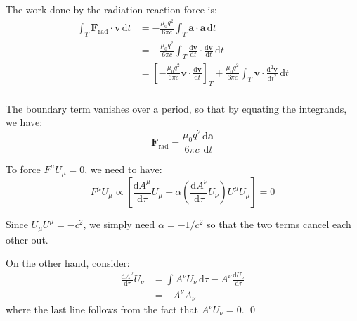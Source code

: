 \documentclass[12pt]{article}
\begin{document}

The work done by the radiation reaction force is:
\begin{equation}
    \begin{split}
        \int_{T} \mathbf{F}_{\text{rad}} \cdot \mathbf{v} \, \mathrm{d}t &= -\frac{\mu_{0}q^{2}}{6\pi c} \int_{T} \mathbf{a} \cdot \mathbf{a} \, \mathrm{d}t \\
        &= -\frac{\mu_{0}q^{2}}{6\pi c} \int_{T} \frac{\mathrm{d}\mathbf{v}}{\mathrm{d}t} \cdot \frac{\mathrm{d}\mathbf{v}}{\mathrm{d}t} \, \mathrm{d}t \\
        &= \left[ -\frac{\mu_{0}q^{2}}{6\pi c} \mathbf{v} \cdot \frac{\mathrm{d}\mathbf{v}}{\mathrm{d}t} \right]_{T} + \frac{\mu_{0}q^{2}}{6\pi c} \int_{T} \mathbf{v} \cdot \frac{\mathrm{d}^{2}\mathbf{v}}{\mathrm{d}t^{2}} \, \mathrm{d}t \\
    \end{split}
\end{equation}

The boundary term vanishes over a period, so that by equating the integrands, we have:
\begin{equation}
    \mathbf{F}_{\text{rad}} = \frac{\mu_{0}q^{2}}{6\pi c} \frac{\mathrm{d}\mathbf{a}}{\mathrm{d}t}
\end{equation}


To force $F^{\mu}U_{\mu} = 0$, we need to have:
\begin{equation}
    F^{\mu}U_{\mu} \propto \left[ \frac{\mathrm{d}A^{\mu}}{\mathrm{d}\tau} U_{\mu} + \alpha \left( \frac{\mathrm{d}A^{\nu}}{\mathrm{d}\tau} U_{\nu} \right) U^{\mu} U_{\mu} \right] = 0
\end{equation}

Since $U_{\mu}U^{\mu} = -c^{2}$, we simply need $\alpha = -1/c^{2}$ so that the two terms cancel each other out.

On the other hand, consider:
\begin{equation}
    \begin{split}
        \frac{\mathrm{d}A^{\nu}}{\mathrm{d}\tau} U_{\nu} &= \int A^{\nu} U_{\nu} \, \mathrm{d}\tau - A^{\nu} \frac{\mathrm{d}U_{\nu}}{\mathrm{d}\tau} \\
        &= -A^{\nu} A_{\nu}
    \end{split}
\end{equation}
where the last line follows from the fact that $A^{\nu} U_{\nu} = 0$.
\qed
\end{document}

